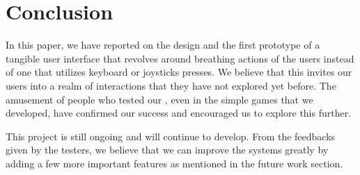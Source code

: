 \section{Conclusion}\label{sec:conc}

In this paper, we have reported on the design and the first prototype of a tangible user interface that revolves around breathing actions of the users instead of one that utilizes keyboard or joysticks presses. We believe that this invites our users into a realm of interactions that they have not explored yet before. The amusement of people who tested our \tube, even in the simple games that we developed, have confirmed our success and encouraged us to explore this further.

This project is still ongoing and will continue to develop. From the feedbacks given by the testers, we believe that we can improve the systems greatly by adding a few more important features as mentioned in the future work section.
